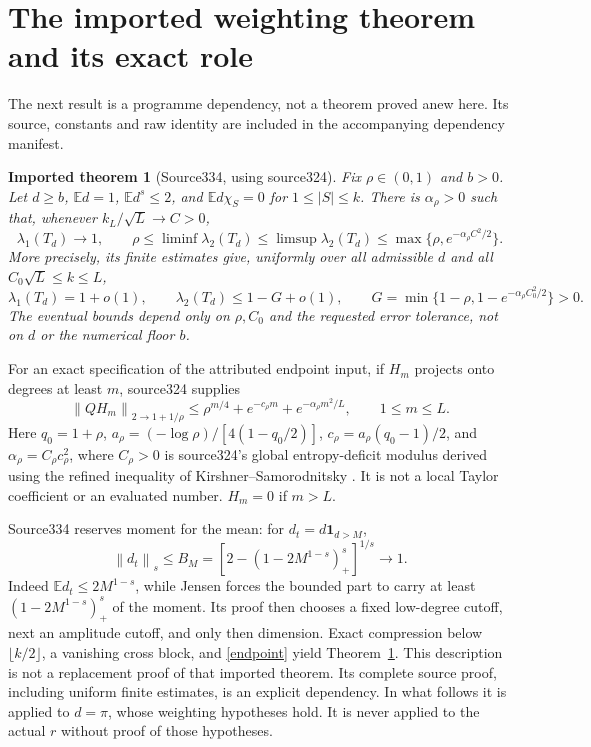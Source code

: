 \documentclass[11pt]{article}
\newtheorem{imported}[theorem]{Imported theorem}
\newcommand{\E}{\mathbb E}
\newcommand{\norm}[1]{\left\|#1\right\|}
\newcommand{\one}{\mathbf 1}
\begin{document}
\section{The imported weighting theorem and its exact role}
The next result is a programme dependency, not a theorem proved anew here. Its source, constants and raw identity are included in the accompanying dependency manifest.
\begin{imported}[Source334, using source324]\label{weighting}
Fix $\rho\in(0,1)$ and $b>0$. Let $d\geq b$, $\E d=1$, $\E d^s\leq2$, and $\E d\chi_S=0$ for $1\leq|S|\leq k$. There is $\alpha_\rho>0$ such that, whenever $k_L/\sqrt L\to C>0$,
\[
 \lambda_1(T_d)\to1,\qquad
 \rho\leq\liminf\lambda_2(T_d)\leq\limsup\lambda_2(T_d)
 \leq\max\{\rho,e^{-\alpha_\rho C^2/2}\}.
\]
More precisely, its finite estimates give, uniformly over all admissible $d$ and all $C_0\sqrt L\leq k\leq L$,
\[
 \lambda_1(T_d)=1+o(1),\qquad
 \lambda_2(T_d)\leq1-G+o(1),\qquad
 G=\min\{1-\rho,1-e^{-\alpha_\rho C_0^2/2}\}>0.
\]
The eventual bounds depend only on $\rho,C_0$ and the requested error tolerance, not on $d$ or the numerical floor $b$.
\end{imported}
For an exact specification of the attributed endpoint input, if $H_m$ projects onto degrees at least $m$, source324 supplies
\begin{equation}\label{endpoint}
 \norm{QH_m}_{2\to 1+1/\rho}
 \leq\rho^{m/4}+e^{-c_\rho m}+e^{-\alpha_\rho m^2/L},
 \qquad1\leq m\leq L.
\end{equation}
Here $q_0=1+\rho$, $a_\rho=(-\log\rho)/[4(1-q_0/2)]$, $c_\rho=a_\rho(q_0-1)/2$, and $\alpha_\rho=C_\rho c_\rho^2$, where $C_\rho>0$ is source324's global entropy-deficit modulus derived using the refined inequality of Kirshner--Samorodnitsky \cite{ks}. It is not a local Taylor coefficient or an evaluated number. $H_m=0$ if $m>L$.

Source334 reserves moment for the mean: for $d_t=d\one_{d>M}$,
\[
 \norm{d_t}_s\leq B_M=
 [2-(1-2M^{1-s})_+^s]^{1/s}\longrightarrow1.
\]
Indeed $\E d_t\leq2M^{1-s}$, while Jensen forces the bounded part to carry at least $(1-2M^{1-s})_+^s$ of the moment. Its proof then chooses a fixed low-degree cutoff, next an amplitude cutoff, and only then dimension. Exact compression below $\lfloor k/2\rfloor$, a vanishing cross block, and \eqref{endpoint} yield Theorem~\ref{weighting}. This description is not a replacement proof of that imported theorem. Its complete source proof, including uniform finite estimates, is an explicit dependency. In what follows it is applied to $d=\pi$, whose weighting hypotheses hold. It is never applied to the actual $r$ without proof of those hypotheses.
\end{document}
